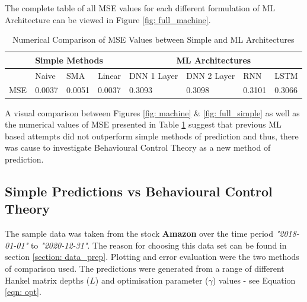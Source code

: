 \noindent The complete table of all MSE values for each different formulation of ML Architecture can be viewed in Figure \ref{fig: full_machine}.

\begin{table}[h]
\begin{center}

\begin{tabular}{llll|llll}
\hline
     & \multicolumn{3}{l|}{Simple Methods}                                & \multicolumn{4}{c}{ML Architectures}                                                                       \\ \hline
     & \multicolumn{1}{l|}{Naive}  & \multicolumn{1}{l|}{SMA}    & Linear & \multicolumn{1}{l|}{DNN 1 Layer} & \multicolumn{1}{l|}{DNN 2 Layer} & \multicolumn{1}{l|}{RNN}    & LSTM   \\ \hline
    \multicolumn{1}{l|}{MSE} & \multicolumn{1}{l|}{0.0037} & \multicolumn{1}{l|}{0.0051} & 0.0037 & \multicolumn{1}{l|}{0.3093}      & \multicolumn{1}{l|}{0.3098}      & \multicolumn{1}{l|}{0.3101} & 0.3066 \\ \hline
\end{tabular}
\label{tab: simp_ml_mse}
\caption{Numerical Comparison of MSE Values between Simple and ML Architectures}
\end{center}
\end{table}

\noindent A visual comparison between Figures \ref{fig: machine} \& \ref{fig: full_simple} as well as the numerical values of MSE presented in Table \ref{tab: simp_ml_mse} suggest that previous ML based attempts did not outperform simple methods of prediction and thus, there was cause to investigate Behavioural Control Theory as a new method of prediction.

\subsection{Simple Predictions vs Behavioural Control Theory}
\label{section: simp_vs_behave}

The sample data was taken from the stock \textbf{Amazon} over the time period \textit{"2018-01-01"} to \textit{"2020-12-31"}. The reason for choosing this data set can be found in section \ref{section: data_prep}. Plotting and error evaluation were the two methods of comparison used. The predictions were generated from a range of different Hankel matrix depths ($L$) and optimisation parameter ($\gamma$) values  - see Equation \ref{eqn: opt}. 

